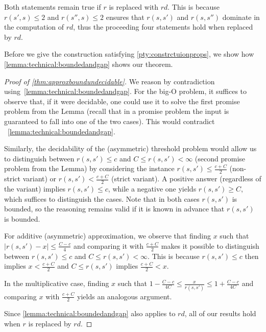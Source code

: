 \documentclass[10pt,a4paper]{amsart}
\numberwithin{equation}{section}
\theoremstyle{plain}
\theoremstyle{definition}
\theoremstyle{remark}
\newcommand\tvra{\mathit{r}}
\newcommand\tvrs{\mathit{rd}}
\begin{document}
\noindent Both statements remain true if $\tvra$ is replaced with $\tvrs$. This is because $\tvra(s',s)\le 2$ and $\tvra(s'',s)\le 2$ ensures that $\tvra(s,s')$ and $\tvra(s,s'')$ dominate in the computation of $\tvrs$, thus the proceeding four statements hold when replaced by $\tvrs$.

Before we give the construction satisfying \cref{pty:constrctuionprops}, we show how \cref{lemma:technical:boundedandgap} shows our theorem.
\begin{proof}[Proof of \cref{thm:approxboundundecidable}]
We reason by contradiction using~\cref{lemma:technical:boundedandgap}.
For the big-O problem,
it suffices to observe that, if it were decidable, one could use it to solve the first promise problem from the Lemma (recall that in a promise problem the input is guaranteed to fall into one of the two cases).
This would contradict ~\cref{lemma:technical:boundedandgap}.

Similarly, the decidability of the (asymmetric) threshold problem would allow us to distinguish between $\tvra(s,s') \le c$ and $C \le \tvra(s,s') < \infty$  (second promise problem from the Lemma) by considering the instance
$\tvra(s,s') \le \frac{c+C}{2}$ (non-strict variant) or $\tvra(s,s') < \frac{c+C}{2}$ (strict variant). A positive answer (regardless of the variant) implies $\tvra(s,s') \le c$, while a negative one yields $\tvra(s,s')\ge C$, which suffices
to distinguish the cases. Note that in both cases $\tvra(s,s')$ is bounded, so the reasoning remains valid  if it is known in advance that $\tvra(s,s')$ is bounded.

For additive  (asymmetric) approximation,  we observe that finding $x$ such that $|\tvra(s,s') - x| \le \frac{C-c}{4}$ and comparing it with $\frac{c+C}{2}$ makes it possible to distinguish between
$\tvra(s,s') \le c$ and $C \le \tvra(s,s') < \infty$. This is because $\tvra(s,s') \le c$ then implies $x < \frac{c+C}{2}$ and $C\le \tvra(s,s')$ implies $\frac{c+C}{2} < x$.

In the multiplicative case,  finding $x$ such that $1-\frac{C-c}{4C}\le \frac{x}{\tvra(s,s')}\le 1+\frac{C-c}{4C}$ and comparing $x$ with $ \frac{c+C}{2}$ yields an analogous argument.

 Since \cref{lemma:technical:boundedandgap} also applies to $\tvrs$, all of our results hold when $\tvra$ is replaced by  $\tvrs$.
\end{proof}
\end{document}
